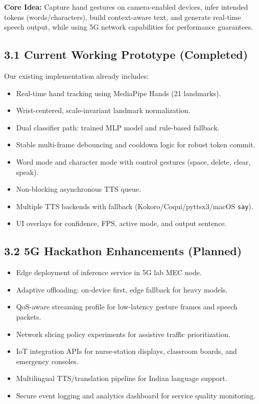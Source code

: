 \documentclass[11pt,a4paper]{article}
\begin{document}
\textbf{Core Idea:} Capture hand gestures on camera-enabled devices, infer intended tokens (words/characters), build context-aware text, and generate real-time speech output, while using 5G network capabilities for performance guarantees.

\subsection*{3.1 Current Working Prototype (Completed)}
Our existing implementation already includes:
\begin{itemize}
    \item Real-time hand tracking using MediaPipe Hands (21 landmarks).
    \item Wrist-centered, scale-invariant landmark normalization.
    \item Dual classifier path: trained MLP model and rule-based fallback.
    \item Stable multi-frame debouncing and cooldown logic for robust token commit.
    \item Word mode and character mode with control gestures (space, delete, clear, speak).
    \item Non-blocking asynchronous TTS queue.
    \item Multiple TTS backends with fallback (Kokoro/Coqui/pyttsx3/macOS \texttt{say}).
    \item UI overlays for confidence, FPS, active mode, and output sentence.
\end{itemize}

\subsection*{3.2 5G Hackathon Enhancements (Planned)}
\begin{itemize}
    \item Edge deployment of inference service in 5G lab MEC node.
    \item Adaptive offloading: on-device first, edge fallback for heavy models.
    \item QoS-aware streaming profile for low-latency gesture frames and speech packets.
    \item Network slicing policy experiments for assistive traffic prioritization.
    \item IoT integration APIs for nurse-station displays, classroom boards, and emergency consoles.
    \item Multilingual TTS/translation pipeline for Indian language support.
    \item Secure event logging and analytics dashboard for service quality monitoring.
\end{itemize}
\end{document}
